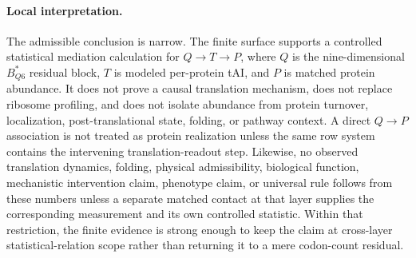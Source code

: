 \paragraph{Local interpretation.}
The admissible conclusion is narrow.  The finite surface supports a controlled statistical mediation calculation for $Q\to T\to P$, where $Q$ is the nine-dimensional $B^*_{Q6}$ residual block, $T$ is modeled per-protein tAI, and $P$ is matched protein abundance.  It does not prove a causal translation mechanism, does not replace ribosome profiling, and does not isolate abundance from protein turnover, localization, post-translational state, folding, or pathway context.  A direct $Q\to P$ association is not treated as protein realization unless the same row system contains the intervening translation-readout step.  Likewise, no observed translation dynamics, folding, physical admissibility, biological function, mechanistic intervention claim, phenotype claim, or universal rule follows from these numbers unless a separate matched contact at that layer supplies the corresponding measurement and its own controlled statistic.  Within that restriction, the finite evidence is strong enough to keep the claim at cross-layer statistical-relation scope rather than returning it to a mere codon-count residual.
